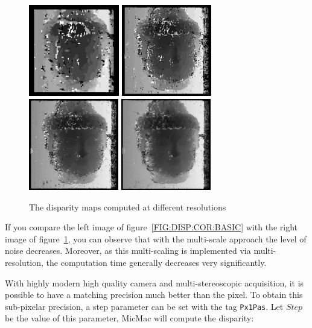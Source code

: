 \begin{figure}
\includegraphics[height=40mm]{FIGS/Boudhas/Px1_MR_Num1.jpg}
\includegraphics[height=40mm]{FIGS/Boudhas/Px1_MR_Num2.jpg}
\includegraphics[height=40mm]{FIGS/Boudhas/Px1_MR_Num3.jpg}
\includegraphics[height=40mm]{FIGS/Boudhas/Px1_MR_Num4.jpg}
\caption{The disparity maps computed at different resolutions}
\label{FIG:DISP:MUL:RES}
\end{figure}



If you compare the left image of figure~\ref{FIG:DISP:COR:BASIC} with the
right image of figure~\ref{FIG:DISP:MUL:RES}, you can observe that with the 
multi-scale approach the level of noise decreases.  Moreover, as this
multi-scaling is implemented via multi-resolution, the computation time
generally decreases very significantly.


With highly modern high quality camera and multi-stereoscopic acquisition,
it is possible to have a matching precision much better than the pixel.
To obtain  this sub-pixelar precision, a step parameter can be set with
the tag  {\tt Px1Pas}. Let $Step$ be the value of this parameter,
MicMac will compute the disparity:

